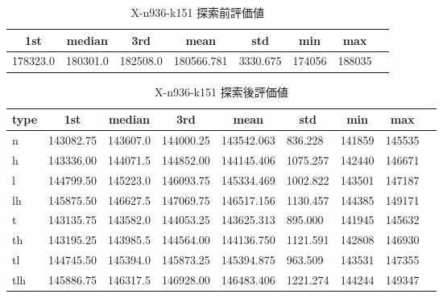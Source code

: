 \begin{table}[htbp]
    \centering
    \caption{X-n936-k151 探索前評価値}
    \begin{tabular}{|l|l|l|l|l|l|l|l|}\hline
    \multicolumn{1}{|c|}{\textbf{1st}}
    &\multicolumn{1}{c|}{\textbf{median}}
    &\multicolumn{1}{c|}{\textbf{3rd}}
    &\multicolumn{1}{c|}{\textbf{mean}}
    &\multicolumn{1}{c|}{\textbf{std}}
    &\multicolumn{1}{c|}{\textbf{min}}
    &\multicolumn{1}{c|}{\textbf{max}}\\\hline
	178323.0 & 180301.0 & 182508.0 & 180566.781 & 3330.675 & 174056 & 188035\\\hline
	\end{tabular}
\end{table}
\begin{table}[htbp]
    \centering
    \caption{X-n936-k151 探索後評価値}
    \begin{tabular}{|l|l|l|l|l|l|l|l|l|}\hline
    \multicolumn{1}{|c|}{\textbf{type}}
    &\multicolumn{1}{|c|}{\textbf{1st}}
    &\multicolumn{1}{c|}{\textbf{median}}
    &\multicolumn{1}{c|}{\textbf{3rd}}
    &\multicolumn{1}{c|}{\textbf{mean}}
    &\multicolumn{1}{c|}{\textbf{std}}
    &\multicolumn{1}{c|}{\textbf{min}}
    &\multicolumn{1}{c|}{\textbf{max}}\\\hline
	n & 143082.75 & 143607.0 & 144000.25 & 143542.063 & 836.228 & 141859 & 145535\\\hline
	h & 143336.00 & 144071.5 & 144852.00 & 144145.406 & 1075.257 & 142440 & 146671\\\hline
	l & 144799.50 & 145223.0 & 146093.75 & 145334.469 & 1002.822 & 143501 & 147187\\\hline
	lh & 145875.50 & 146627.5 & 147069.75 & 146517.156 & 1130.457 & 144385 & 149171\\\hline
	t & 143135.75 & 143582.0 & 144053.25 & 143625.313 & 895.000 & 141945 & 145632\\\hline
	th & 143195.25 & 143985.5 & 144564.00 & 144136.750 & 1121.591 & 142808 & 146930\\\hline
	tl & 144745.50 & 145394.0 & 145873.25 & 145394.875 & 963.509 & 143531 & 147355\\\hline
	tlh & 145886.75 & 146317.5 & 146928.00 & 146483.406 & 1221.274 & 144244 & 149347\\\hline
	\end{tabular}
\end{table}
